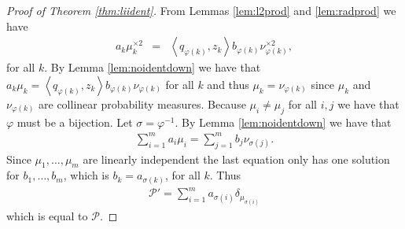 \documentclass[aos,preprint]{imsart}
\def\l{\left}
\def\r{\right}
\def\sP{\mathscr{P}}
\theoremstyle{plain}
\theoremstyle{defintion}
\begin{document}
\begin{proof}[Proof of Theorem \ref{thm:liident}]
                From Lemmas \ref{lem:l2prod} and \ref{lem:radprod} we have
		\begin{eqnarray*}
			a_k \mu_k^{\times 2} &=& \l<q_{\varphi\left( k \right)},z_k\r>b_{\varphi\left( k \right)} \nu_{\varphi\left( k \right)}^{\times 2},
		\end{eqnarray*}
		for all $k$.
		By Lemma \ref{lem:noidentdown} we have that $a_k \mu_k = \l<q_{\varphi\left( k \right)},z_k\r>b_{\varphi\left( k \right)} \nu_{\varphi\left( k \right)}$ for all $k$ and thus $\mu_k = \nu_{\varphi\left( k \right)}$ since $\mu_k$ and $\nu_{\varphi(k)}$ are collinear probability measures. Because $\mu_i \neq \mu_j$ for all $i,j$ we have that $\varphi$ must be a bijection. Let $\sigma = \varphi^{-1}.$
		By Lemma \ref{lem:noidentdown} we have that
		\begin{eqnarray*}
			\sum_{i=1}^m a_i \mu_i = \sum_{j=1}^m b_j \nu_{\sigma\left( j \right)}.
		\end{eqnarray*}
		Since $\mu_1,\ldots,\mu_m$ are linearly independent the last equation only has one solution for $b_1,\ldots,b_m$, which is $b_k = a_{\sigma\left( k \right)}$, for all $k$. Thus
		\begin{eqnarray*}
			\sP' = \sum_{i=1}^m a_{\sigma\left( i \right)} \delta_{ \mu_{\sigma\left( i \right)}}
		\end{eqnarray*}
		which is equal to $\sP$.
	\end{proof}
\end{document}
